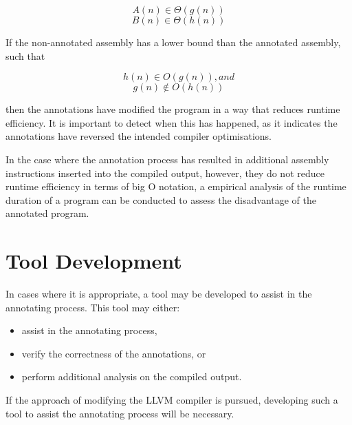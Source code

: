 \[A(n) \in \Theta(g(n))\]
\[B(n) \in \Theta(h(n))\]

If the non-annotated assembly has a lower bound than the annotated assembly, such that

\[h(n) \in O(g(n)), and\]
\[g(n) \notin O(h(n))\]

then the annotations have modified the program in a way that reduces runtime efficiency. It is important to detect when this has happened, as it indicates the annotations have reversed the intended compiler optimisations.

In the case where the annotation process has resulted in additional assembly instructions inserted into the compiled output, however, they do not reduce runtime efficiency in terms of big O notation, a empirical analysis of the runtime duration of a program can be conducted to assess the disadvantage of the annotated program.

\section{Tool Development}
\label{sec:toolDevelopment}
In cases where it is appropriate, a tool may be developed to assist in the annotating process. This tool may either:
\begin{itemize}
    \item assist in the annotating process,
    \item verify the correctness of the annotations, or
    \item perform additional analysis on the compiled output.
\end{itemize}
If the approach of modifying the LLVM compiler is pursued, developing such a tool to assist the annotating process will be necessary.